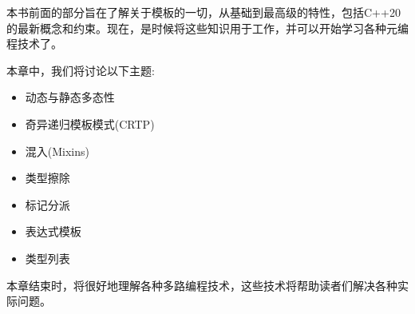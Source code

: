 
本书前面的部分旨在了解关于模板的一切，从基础到最高级的特性，包括C++20的最新概念和约束。现在，是时候将这些知识用于工作，并可以开始学习各种元编程技术了。

本章中，我们将讨论以下主题:

\begin{itemize}
\item
动态与静态多态性

\item
奇异递归模板模式(CRTP)

\item
混入(Mixins)

\item
类型擦除

\item
标记分派

\item
表达式模板

\item
类型列表
\end{itemize}

本章结束时，将很好地理解各种多路编程技术，这些技术将帮助读者们解决各种实际问题。